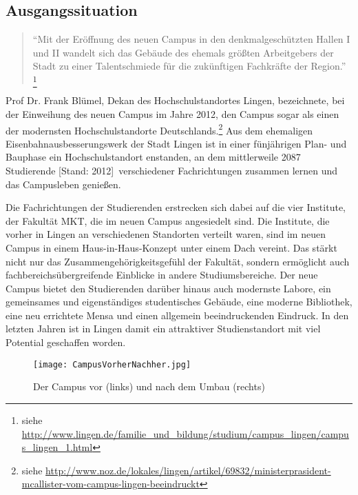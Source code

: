 \subsection{Ausgangssituation}
\label{sec:Ausgangssituation}

\begin{quote}
"`Mit der Eröffnung des neuen Campus in den denkmalgeschützten Hallen I und II wandelt 
sich das Gebäude des ehemals größten Arbeitgebers der Stadt zu einer 
Talentschmiede für die zukünftigen Fachkräfte der Region."'
\footnote{siehe \url{http://www.lingen.de/familie_und_bildung/studium/campus_lingen/campus_lingen_1.html}}
\end{quote}

Prof Dr. Frank Blümel, Dekan des Hochschulstandortes Lingen, bezeichnete, bei der Einweihung
des neuen Campus im Jahre 2012, den Campus sogar als einen der modernsten Hochschulstandorte
Deutschlands.\footnote{siehe \url{http://www.noz.de/lokales/lingen/artikel/69832/ministerprasident-mcallister-vom-campus-lingen-beeindruckt}}
Aus dem ehemaligen Eisenbahnausbesserungswerk der Stadt Lingen ist in einer fünjährigen Plan- und Bauphase
ein Hochschulstandort enstanden, an dem mittlerweile 2087 Studierende [Stand: 2012]\footnotemark\ verschiedener
Fachrichtungen zusammen lernen und das Campusleben genießen.

Die Fachrichtungen der Studierenden erstrecken sich dabei auf die vier Institute, der Fakultät \ac{MKT}, die im neuen Campus angesiedelt sind. Die Institute, die vorher in Lingen an verschiedenen
Standorten verteilt waren, sind im neuen Campus in einem Haus-in-Haus-Konzept unter einem Dach vereint.
Das stärkt nicht nur das Zusammengehörigkeitsgefühl der Fakultät, sondern ermöglicht auch fachbereichsübergreifende
Einblicke in andere Studiumsbereiche. Der neue Campus bietet den Studierenden darüber hinaus auch modernste
Labore, ein gemeinsames und eigenständiges studentisches Gebäude, eine moderne Bibliothek, eine neu errichtete Mensa
und einen allgemein beeindruckenden Eindruck. In den letzten Jahren ist in Lingen damit ein attraktiver
Studienstandort mit viel Potential geschaffen worden.

\begin{figure}[htb] 
\centering
\texttt{[image: CampusVorherNachher.jpg]}
\caption[Vorher-Nachher-Vergleich]{Der Campus vor (links) und nach dem Umbau (rechts)\protect\footnotemark}
\label{fig:CampusVorher}
\end{figure}
